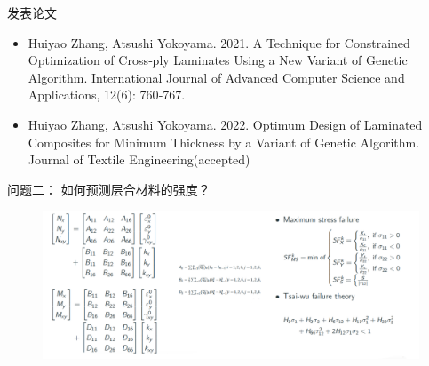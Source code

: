 \documentclass{beamer}
\begin{document}
\begin{frame}{发表论文}
	\begin{center}
		\begin{itemize}
			\item Huiyao Zhang, Atsushi Yokoyama. 2021. A Technique for Constrained Optimization of Cross‑ply Laminates Using a New
				Variant of Genetic Algorithm. International Journal of Advanced Computer Science and Applications, 12(6): 760‑767.
			\item Huiyao Zhang, Atsushi Yokoyama. 2022. Optimum Design of Laminated Composites for Minimum Thickness by a Variant
				of Genetic Algorithm. Journal of Textile Engineering(accepted)
		\end{itemize}
	\end{center}
\end{frame}





\begin{frame}{问题二： 如何预测层合材料的强度？ }
	\begin{center}
		\begin{figure}
			\includegraphics[width=1\textwidth]{fig/part3/formula_for_stenght_calculation.png}
		\end{figure}
	\end{center}
\end{frame}
\end{document}
